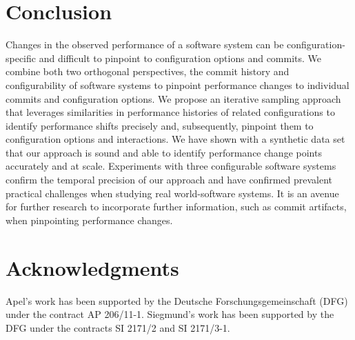 \documentclass[sigconf]{acmart}
\begin{document}
	\section{Conclusion}
	Changes in the observed performance of a software system can be configuration-specific and difficult to pinpoint to configuration options and commits. We combine both two orthogonal perspectives, the commit history and configurability of software systems to pinpoint performance changes to individual commits and configuration options. 
	We propose an iterative sampling approach that leverages similarities in performance histories of related configurations to identify performance shifts precisely and, subsequently, pinpoint them to configuration options and interactions. 
	We have shown with a synthetic data set that our approach is sound and able to identify performance change points accurately and at scale. Experiments with three configurable software systems confirm the temporal precision of our approach and have confirmed prevalent practical challenges when studying real world-software systems. It is an avenue for further research to incorporate further information, such as commit artifacts, when pinpointing performance changes.
	
	\section{Acknowledgments}
	Apel’s work has been supported by the Deutsche Forschungsgemeinschaft (DFG) under the contract AP 206/11-1. Siegmund’s work has been supported by the DFG under the
	contracts SI 2171/2 and SI 2171/3-1.
	
	\clearpage
	
	
	
	\clearpage
	
	
\end{document}

